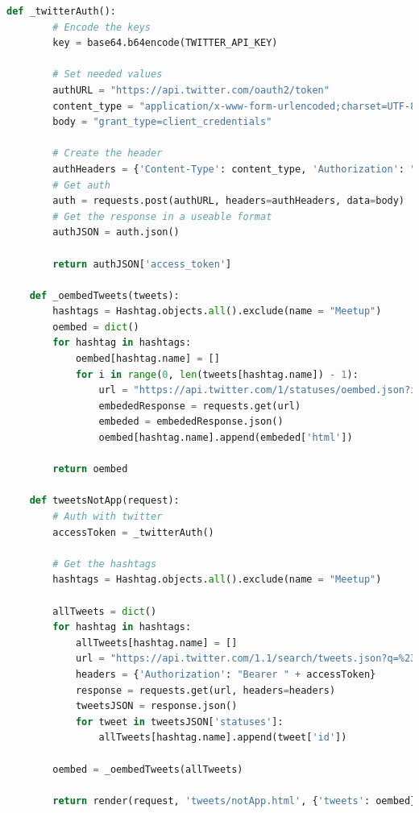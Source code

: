 \documentclass[draftclsnofoot,10pt,onecolumn]{IEEEtran} %
\begin{document}
\begin{center}
\captionsetup{width=.5\linewidth}
  \begin{lstlisting}[caption=Views.py showing the Twitter authorization and
  searching for tweets for the tweets not from the application, language=Python]
    def _twitterAuth():
        # Encode the keys
        key = base64.b64encode(TWITTER_API_KEY)

        # Set needed values
        authURL = "https://api.twitter.com/oauth2/token"
        content_type = "application/x-www-form-urlencoded;charset=UTF-8"
        body = "grant_type=client_credentials"

        # Create the header
        authHeaders = {'Content-Type': content_type, 'Authorization': "Basic " + key}
        # Get auth
        auth = requests.post(authURL, headers=authHeaders, data=body)
        # Get the response in a useable format
        authJSON = auth.json()
        
        return authJSON['access_token']

    def _oembedTweets(tweets):
        hashtags = Hashtag.objects.all().exclude(name = "Meetup")
        oembed = dict()
        for hashtag in hashtags:
            oembed[hashtag.name] = []
            for i in range(0, len(tweets[hashtag.name]) - 1):
                url = "https://api.twitter.com/1/statuses/oembed.json?id=" + str(tweets[hashtag.name][i])
                embededResponse = requests.get(url)
                embeded = embededResponse.json()
                oembed[hashtag.name].append(embeded['html'])

        return oembed

    def tweetsNotApp(request):
        # Auth with twitter
        accessToken = _twitterAuth()

        # Get the hashtags
        hashtags = Hashtag.objects.all().exclude(name = "Meetup")

        allTweets = dict()
        for hashtag in hashtags:
            allTweets[hashtag.name] = []
            url = "https://api.twitter.com/1.1/search/tweets.json?q=%23" + hashtag.name + "&src=typd"
            headers = {'Authorization': "Bearer " + accessToken}
            response = requests.get(url, headers=headers)
            tweetsJSON = response.json()
            for tweet in tweetsJSON['statuses']:
                allTweets[hashtag.name].append(tweet['id'])

        oembed = _oembedTweets(allTweets)

        return render(request, 'tweets/notApp.html', {'tweets': oembed})
  \end{lstlisting}
\end{center}
\end{document}
